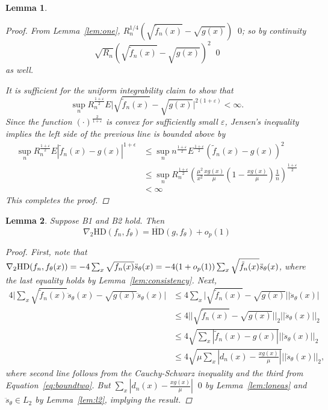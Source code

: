 \documentclass[11 pt]{article}
\newtheorem{lem}{Lemma}
\renewcommand{\th}{\theta}
\newcommand{\xra}[1]{\mathop{ \xrightarrow{#1} }}
\newcommand{\hell}{\text{HD}}
\newcommand{\ddhell}{\ddot{\hell}}
\newcommand{\gs}{\frac{xg(x)}{\mu}}
\newcommand{\fnt}{\tilde{f}_n(x)}
\newcommand{\ddsth}{\ddot{s}_{\theta}}
\newcommand{\fthnx}{f_{\th}}
\begin{document}
\begin{lem}
\begin{proof}
From Lemma~\ref{lem:one}, $R_n^{1/4} \left ( \sqrt{\fnt} - \sqrt{g(x)} \right ) \xra{a.s.} 0$; so by continuity 
\[
\sqrt{R_n} \left ( \sqrt{\fnt} - \sqrt{g(x)} \right )^2 \xra{a.s.} 0
\]
as well.

It is sufficient for the uniform integrability claim to show that
\[
\sup_n R_n^{\frac{1 + \varepsilon}{2}} E \bigg | \sqrt{\fnt} - \sqrt{g(x)} \bigg |^{2(1 + \varepsilon)} < \infty.
\]
Since the function $(\cdot)^{\frac{2}{1+\varepsilon}}$ is convex for sufficiently small $\varepsilon$, Jensen's inequality implies the left side of the previous line is bounded above by
\begin{align*}
\sup_n R_n^{\frac{1 + \varepsilon}{2}} E | \fnt - g(x) |^{1 + \epsilon} &\leq \sup_n n^{\frac{1 + \varepsilon}{2}} E^{\frac{1 + \varepsilon}{2}} ( \fnt - g(x) )^2 \\
&\leq \sup_n R_n^{\frac{1 + \varepsilon}{2}} \left( \frac{\mu^2}{x^2} \gs \left (1-\gs \right ) \frac{1}{n} \right)^{\frac{1 + \varepsilon}{2}} \\
&< \infty
\end{align*}
This completes the proof.
\end{proof}
\end{lem}



\begin{lem}
Suppose B1 and B2 hold. Then
\[
\nabla_2\hell(f_n,\fthnx) = \ddhell(g,\fthnx) + o_p(1)
\]
\label{lem:secondorder}
\begin{proof}
First, note that $\nabla_2\hell(f_n,\fth) = -4 \sum_x \sqrt{f_n(x)} \ddsth(x) = -4 (1 + o_p(1)) \sum_x \sqrt{\fnt} \ddsth(x)$, where the last equality holds by Lemma~\ref{lem:consistency}. Next,
\begin{align*}
4 \bigg | \sum_x \sqrt{\fnt} \ddsth(x) - \sqrt{g(x)} \ddsth(x)\bigg | &\leq  4   \sum_x \bigg | \sqrt{\fnt} - \sqrt{g(x)} \bigg| |\ddsth(x)| \\
&\leq  4  \bigg| \bigg| \sqrt{\fnt} - \sqrt{g(x)} \bigg | \bigg |_2 ||\ddsth(x)||_2 \\
&\leq  4  \sqrt{\sum_x |\fnt - g(x) |}   ||\ddsth(x)||_2 \\
&\leq  4  \sqrt{ \mu \sum_x |d_n(x) - \gs |}   ||\ddsth(x)||_2, 
\end{align*}
where second line follows from the Cauchy-Schwarz inequality and the third from Equation~\eqref{eq:boundtwo}. But $\sum_x |d_n(x) - \gs | \xra{a.s.} 0$ by Lemma~\ref{lem:loneas} and $\ddsth \in L_2$ by Lemma~\ref{lem:l2}, implying the result.
\end{proof}
\end{lem}
\end{document}
